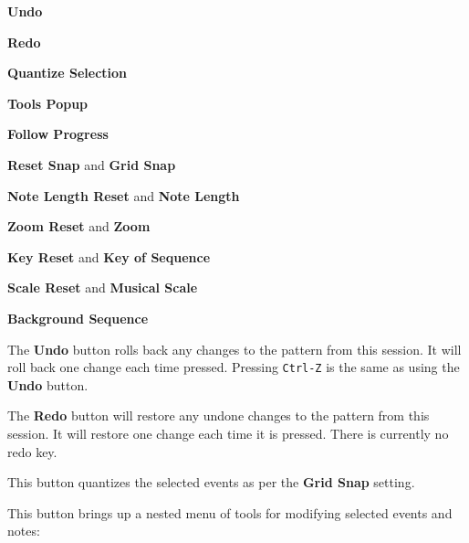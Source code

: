   \begin{enumber}
      \item \textbf{Undo}
      \item \textbf{Redo}
      \item \textbf{Quantize Selection}
      \item \textbf{Tools Popup}
      \item \textbf{Follow Progress}
      \item \textbf{Reset Snap} and \textbf{Grid Snap}
      \item \textbf{Note Length Reset} and \textbf{Note Length}
      \item \textbf{Zoom Reset} and \textbf{Zoom}
      \item \textbf{Key Reset} and \textbf{Key of Sequence}
      \item \textbf{Scale Reset} and \textbf{Musical Scale}
      \item \textbf{Background Sequence}
   \end{enumber}

   \setcounter{ItemCounter}{0}      %

   The \textbf{Undo} button rolls back any changes to the pattern from this
   session.  It will roll back one change each time pressed.
   Pressing \texttt{Ctrl-Z} is the same as using the \textbf{Undo} button.

   The \textbf{Redo} button will restore any undone changes to the pattern from
   this session.
   It will restore one change each time it is pressed.
   There is currently no redo key.

   This button quantizes the selected events as per
   the \textbf{Grid Snap} setting.

   This button brings up a nested menu of tools for modifying selected
   events and notes:

